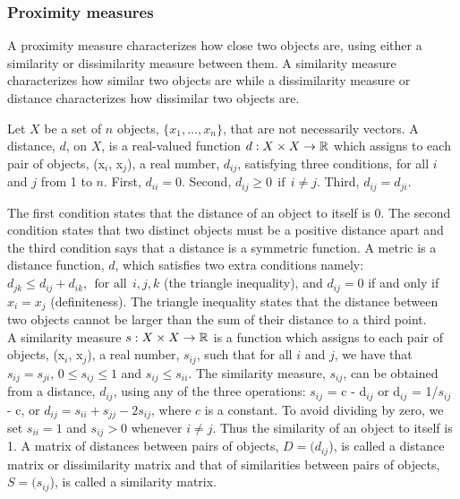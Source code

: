 \subsubsection{Proximity measures}
A proximity measure characterizes how close two objects are, using
either a similarity or dissimilarity measure between them.
A similarity measure characterizes how similar two objects are while
a dissimilarity measure or distance characterizes how dissimilar two objects are.
\begin{Def}\label{distance}
Let $X$ be a set of $n$ objects, $\{x_{1}, \dots, x_{n}\}$, that are not necessarily vectors. A distance, $d$, on $X$, is a real-valued  function
$d: X \times X \rightarrow  \operatorname{\mathbb{R}}$ which assigns to each pair of objects, (x$_{i}$, x$_{j}$), a real number, $d_{ij}$, satisfying three conditions, for all $i$ and $j$ from 1 to $n$. First, $d_{ii} = 0.$ Second, $d_{ij} \geq 0\ \  \text{if}\ \ i \neq j$. Third, $d_{ij} = d_{ji}.$
\end{Def}

The first condition states that the distance of an object to itself is $0$.
The second condition states that two distinct objects must be a positive distance apart and the third condition says that a distance is a symmetric function.
A metric is a distance function, $d$, which satisfies two extra conditions namely:
$d_{jk} \leq d_{ij} + d_{ik}, \ \ \text{for all}\ \ i,j,k$ (the triangle inequality), and $d_{ij} = 0$ if and only if  $x_{i} = x_{j}$ (definiteness). The triangle inequality states that the distance between two objects cannot be larger than the sum of their distance to a third point.\\

A similarity measure $s: X \times X \rightarrow  \operatorname{\mathbb{R}}$ is a function which assigns to each pair of objects, (x$_{i}$, x$_{j}$), a real number, $s_{ij}$, such that
for all $i$ and $j$, we have that
$s_{ij} = s_{ji}$, $0 \leq s_{ij} \leq 1$ and $s_{ij} \leq s_{ii}$.
The similarity measure, $s_{ij}$, can be obtained from a distance, $d_{ij}$, using any of the three operations: $s_{ij}$ = c - d$_{ij}$ or  d$_{ij}$ = 1/$s_{ij}$ - c, or $d_{ij} = s_{ii} + s_{jj} - 2s_{ij}$,
where $c$ is a constant.
To avoid dividing by zero, we set $s_{ii} = 1$ and $s_{ij} > 0$ whenever $i \neq j$. Thus the similarity of an object to itself is 1.
A matrix of distances between pairs of objects, $D = (d_{ij}$), is called a distance matrix or dissimilarity matrix and that of similarities between pairs of objects, $S = (s_{ij}$), is called a similarity matrix.

